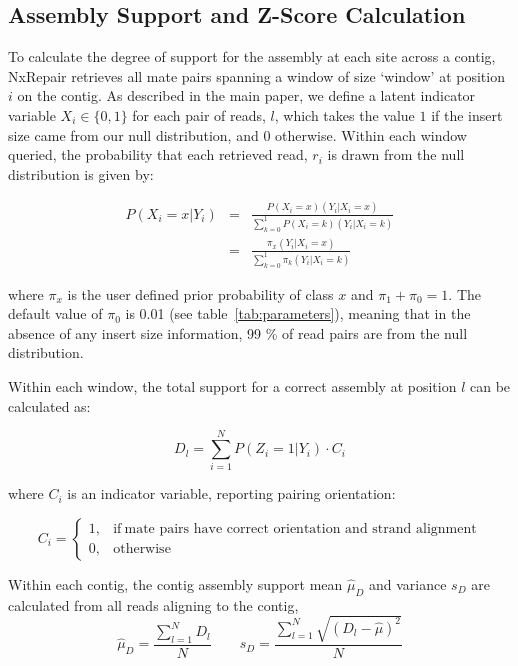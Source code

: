 \documentclass[12pt]{article}
\begin{document}
\subsection{Assembly Support and Z-Score Calculation}
To calculate the degree of support for the assembly at each site across a contig, NxRepair retrieves all mate pairs spanning a window of size `window' at position $i$ on the contig. As described in the main paper, we define a latent indicator variable $X_i\in\{0,1\}$ for each pair of reads, $l$, which takes the value $1$ if the insert size came from our null distribution, and $0$ otherwise. Within each window queried, the probability that each retrieved read, $r_i$ is drawn from the null distribution is given by:

\begin{eqnarray} P(X_i=x|Y_i)& =& \frac{P(X_i=x)(Y_i|X_i=x)}{\sum_{k=0}^1P(X_i=k)(Y_i|X_i=k)}\\
  & =& \frac{\pi_x(Y_i|X_i=x)}{\sum_{k=0}^1 \pi_k(Y_i|X_i=k)}
\label{eq:posterior}  
\end{eqnarray}

where $\pi_x$ is the user defined prior probability of class $x$ and $\pi_1 + \pi_0 = 1$. The default value of $\pi_0$ is 0.01 (see table~\ref{tab:parameters}), meaning that in the absence of any insert size information, 99 \% of read pairs are from the null distribution.  

Within each window, the total support for a correct assembly at position $l$ can be calculated as:

\begin{equation}
D_l = \sum_{i=1}^N P(Z_i=1|Y_i)\cdot C_i
\end{equation}

where $C_i$ is an indicator variable, reporting pairing orientation:

\begin{equation}
    C_i=
    \begin{cases}
      1, & \text{if}\ \text{mate pairs have correct orientation and strand alignment} \\
      0, & \text{otherwise}
    \end{cases}
  \label{eq:C}
  \end{equation}

Within each contig, the contig assembly support mean $\hat{\mu}_D$ and variance $s_D$ are calculated from all reads aligning to the contig,
\begin{equation}
\hat{\mu}_D = \frac{\sum_{l=1}^N D_l}{N} \qquad s_D = \frac{\sum_{l=1}^N \sqrt{(D_l - \hat{\mu})^2}}{N}
\label{eq:contigD}
\end{equation}
\end{document}
